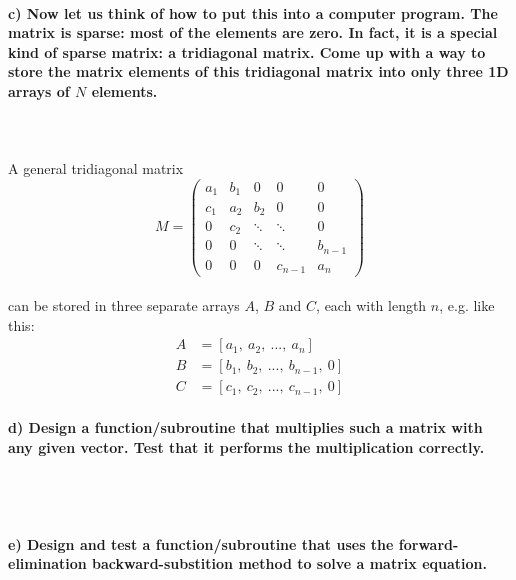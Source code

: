\paragraph{
    c) Now let us think of how to put this into a computer program. The 
    matrix is sparse: most of the elements are zero. In fact, it is a 
    special kind of sparse matrix: a tridiagonal matrix. Come up with a 
    way to store the matrix elements of this tridiagonal matrix into 
    only three 1D arrays of $N$ elements.
} \ \\
    \\
    A general tridiagonal matrix 
    \begin{equation}
        M=
        \begin{pmatrix}
            a_1 & b_1 & 0      & 0       & 0 \\        
            c_1 & a_2 & b_2    & 0       & 0 \\        
            0   & c_2 & \ddots & \ddots  & 0 \\        
            0   & 0   & \ddots & \ddots  & b_{n-1} \\        
            0   & 0   & 0      & c_{n-1} & a_n
        \end{pmatrix}
    \end{equation} \ \\
    can be stored in three separate arrays $A$, $B$ and $C$, each with 
    length $n$, e.g. like this:
    \begin{align}
        A&=[a_1,\ a_2,\ ...,\ a_n] \\
        B&=[b_1,\ b_2,\ ...,\ b_{n-1},\ 0] \\
        C&=[c_1,\ c_2,\ ...,\ c_{n-1},\ 0]    
    \end{align}

\paragraph{
    d) Design a function/subroutine that multiplies such a matrix with 
    any given vector. Test that it performs the multiplication correctly.
} \ \\
    \\

\paragraph{
    e) Design and test a function/subroutine that uses the 
    forward-elimination backward-substition method to solve a matrix 
    equation.
} \ \\
    \\

